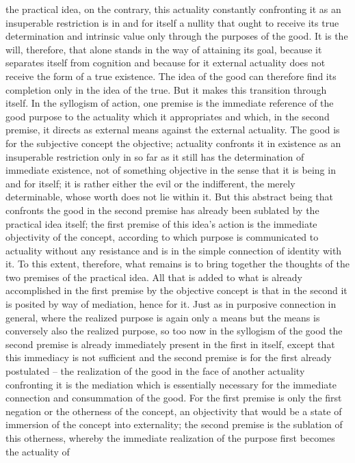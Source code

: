 the practical idea, on the contrary, this actuality constantly confronting it
as an insuperable restriction is in and for itself a nullity that ought to receive
its true determination and intrinsic value only through the purposes of the
good. It is the will, therefore, that alone stands in the way of attaining its
goal, because it separates itself from cognition and because for it external
actuality does not receive the form of a true existence. The idea of the good
can therefore find its completion only in the idea of the true.
But it makes this transition through itself. In the syllogism of action, one
premise is the immediate reference of the good purpose to the actuality which
it appropriates and which, in the second premise, it directs as external
means against the external actuality. The good is for the subjective concept
the objective; actuality confronts it in existence as an insuperable restriction
only in so far as it still has the determination of immediate existence, not
of something objective in the sense that it is being in and for itself; it is
rather either the evil or the indifferent, the merely determinable, whose
worth does not lie within it. But this abstract being that confronts the
good in the second premise has already been sublated by the practical idea
itself; the first premise of this idea’s action is the immediate objectivity of
the concept, according to which purpose is communicated to actuality
without any resistance and is in the simple connection of identity with it.
To this extent, therefore, what remains is to bring together the thoughts of
the two premises of the practical idea. All that is added to what is already
accomplished in the first premise by the objective concept is that in the
second it is posited by way of mediation, hence for it. Just as in purposive
connection in general, where the realized purpose is again only a means
but the means is conversely also the realized purpose, so too now in the
syllogism of the good the second premise is already immediately present in
the first in itself, except that this immediacy is not sufficient and the second
premise is for the first already postulated – the realization of the good in the
face of another actuality confronting it is the mediation which is essentially
necessary for the immediate connection and consummation of the good.
For the first premise is only the first negation or the otherness of the concept,
an objectivity that would be a state of immersion of the concept into
externality; the second premise is the sublation of this otherness, whereby
the immediate realization of the purpose first becomes the actuality of
